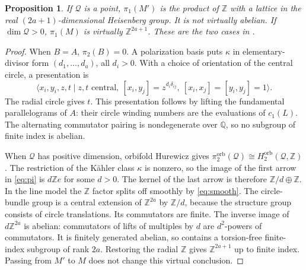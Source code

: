 \documentclass[12pt]{amsart}
\newtheorem{prop}[thm]{Proposition}
\theoremstyle{definition}
\theoremstyle{remark}
\numberwithin{equation}{section}
\newcommand{\orb}{\mathrm{orb}}
\newcommand{\Z}{\mathbb{Z}}
\newcommand{\Q}{\mathbb{Q}}
\newcommand{\Qfac}{\mathcal{Q}}
\begin{document}
\begin{prop}\label{prop:pi}
If $\Qfac$ is a point, $\pi_1(M')$ is the product of $\Z$ with a
lattice in the real $(2a+1)$-dimensional Heisenberg group. It is not
virtually abelian. If $\dim\Qfac>0$, $\pi_1(M)$ is virtually
$\Z^{2a+1}$. These are the two cases in
\cite[Corollary 5.10]{Istrati}.
\end{prop}
\begin{proof}
When $B=A$, $\pi_2(B)=0$. A polarization basis puts $\kappa$ in
elementary-divisor form $(d_1,\ldots,d_a)$, all $d_i>0$. With a
choice of orientation of the central circle, a presentation is
\begin{equation}\label{eq:heis}
\langle x_i,y_i,z,t\mid z,t\text{ central},\
[x_i,y_j]=z^{d_i\delta_{ij}},\ [x_i,x_j]=[y_i,y_j]=1\rangle.
\end{equation}
The radial circle gives $t$. This presentation follows by lifting the
fundamental parallelograms of $A$: their circle winding numbers are
the evaluations of $c_1(L)$. The alternating commutator pairing is
nondegenerate over $\Q$, so no subgroup of finite index is abelian.

When $\Qfac$ has positive dimension, orbifold Hurewicz gives
$\pi_2^{\orb}(\Qfac)\cong H_2^{\orb}(\Qfac,\Z)$.
The restriction of the K\"ahler class $\kappa$ is nonzero, so the
image of the first arrow in \eqref{eq:pi} is $d\Z e$ for some $d>0$.
The kernel of the last arrow is therefore $\Z/d\oplus\Z$.
In the line model the $\Z$ factor splits off smoothly by
\eqref{eq:smooth}. The circle-bundle group is a central extension of
$\Z^{2a}$ by $\Z/d$, because the structure group consists of circle
translations. Its commutators are finite. The inverse image of
$d\Z^{2a}$ is abelian: commutators of lifts of multiples by $d$
are $d^2$-powers of commutators. It is finitely generated abelian,
so contains a torsion-free finite-index subgroup of rank $2a$.
Restoring the radial $\Z$ gives $\Z^{2a+1}$ up to finite index.
Passing from $M'$ to $M$ does not change this virtual conclusion.
\end{proof}
\end{document}
